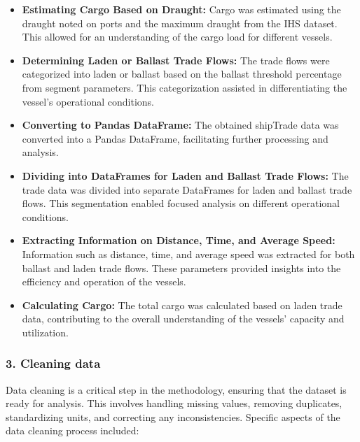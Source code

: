 \begin{itemize}
    \item \textbf{Estimating Cargo Based on Draught:} Cargo was estimated using the draught noted on ports and the maximum draught from the IHS dataset. This allowed for an understanding of the cargo load for different vessels.
    
    \item \textbf{Determining Laden or Ballast Trade Flows:} The trade flows were categorized into laden or ballast based on the ballast threshold percentage from segment parameters. This categorization assisted in differentiating the vessel's operational conditions.
    
    \item \textbf{Converting to Pandas DataFrame:} The obtained shipTrade data was converted into a Pandas DataFrame, facilitating further processing and analysis.
    
    \item \textbf{Dividing into DataFrames for Laden and Ballast Trade Flows:} The trade data was divided into separate DataFrames for laden and ballast trade flows. This segmentation enabled focused analysis on different operational conditions.
    
    \item \textbf{Extracting Information on Distance, Time, and Average Speed:} Information such as distance, time, and average speed was extracted for both ballast and laden trade flows. These parameters provided insights into the efficiency and operation of the vessels.
    
    \item \textbf{Calculating Cargo:} The total cargo was calculated based on laden trade data, contributing to the overall understanding of the vessels' capacity and utilization.
\end{itemize}



\subsubsection{3. Cleaning data}

Data cleaning is a critical step in the methodology, ensuring that the dataset is ready for analysis. This involves handling missing values, removing duplicates, standardizing units, and correcting any inconsistencies. Specific aspects of the data cleaning process included:


